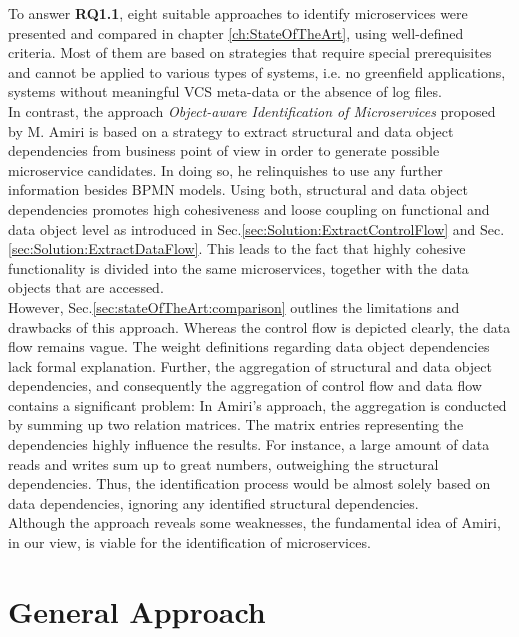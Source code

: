 To answer \textbf{RQ1.1}, eight suitable approaches to identify microservices were presented and compared in chapter \ref{ch:StateOfTheArt}, using well-defined criteria. Most of them are based on strategies that require special prerequisites and cannot be applied to various types of systems, i.e. no greenfield applications, systems without meaningful VCS meta-data or the absence of log files. \\
In contrast, the approach \textit{Object-aware Identification of Microservices} proposed by M. Amiri \cite{ObjectAwareAmiri} is based on a strategy to extract structural and data object dependencies from business point of view in order to generate possible microservice candidates. In doing so, he relinquishes to use any further information besides BPMN models. Using both, structural and data object dependencies promotes high cohesiveness and loose coupling on functional and data object level as introduced in Sec.\ref{sec:Solution:ExtractControlFlow} and Sec.\ref{sec:Solution:ExtractDataFlow}. This leads to the fact that highly cohesive functionality is divided into the same microservices, together with the data objects that are accessed.  \\
However, Sec.\ref{sec:stateOfTheArt:comparison} outlines the limitations and drawbacks of this approach. Whereas the control flow is depicted clearly, the data flow remains vague. The weight definitions regarding data object dependencies lack formal explanation. Further, the aggregation of structural and data object dependencies, and consequently the aggregation of control flow and data flow contains a significant problem: In Amiri's approach, the aggregation is conducted by summing up two relation matrices. The matrix entries representing the dependencies highly influence the results. For instance, a large amount of data reads and writes sum up to great numbers, outweighing the structural dependencies. Thus, the identification process would be almost solely based on data dependencies, ignoring any identified structural dependencies. \\
Although the approach reveals some weaknesses, the fundamental idea of Amiri, in our view, \cite{ObjectAwareAmiri} is viable for the identification of microservices.








\section{General Approach}



